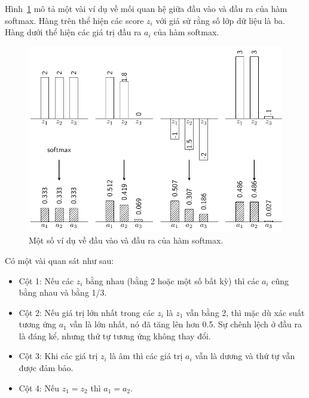 Hình~\ref{fig:13_3} mô tả một vài ví dụ về mối quan hệ giữa đầu vào và đầu ra
của hàm softmax. Hàng trên thể hiện các score $z_i$ với giả sử rằng số lớp dữ
liệu là ba. Hàng dưới thể hiện các giá trị đầu ra $a_i$ của hàm softmax.
 

\begin{figure}[t]
\centering
    \includegraphics[width =
    .8\textwidth]{Chapters/05_NeuralNetworks/13_softmax/latex/softmax_ex.pdf}
    \caption[]{Một số ví dụ về đầu vào và đầu ra của hàm softmax.}
    \label{fig:13_3}
\end{figure}
 \newpage 
Có một vài quan sát như sau:  
\begin{itemize}
\item Cột 1: Nếu các $z_i$ bằng nhau (bằng 2 hoặc một số bất kỳ) thì các $a_i$
cũng bằng nhau
và bằng 1/3.
 
\item Cột 2: Nếu giá trị lớn nhất trong các $z_i$ là $z_1$ vẫn bằng 2, thì mặc
dù xác suất
tương ứng $a_1$ vẫn là lớn nhất, nó đã tăng lên hơn 0.5. Sự chênh lệch ở
đầu ra là đáng kể, nhưng thứ tự tương ứng không thay đổi. 

\item Cột 3: Khi các giá trị $z_i$ là âm thì các giá trị $a_i$ vẫn là dương và thứ tự vẫn được đảm bảo.  
 
\item Cột 4: Nếu $z_1 = z_2$ thì $a_1 = a_2$. 
\end{itemize}
 
